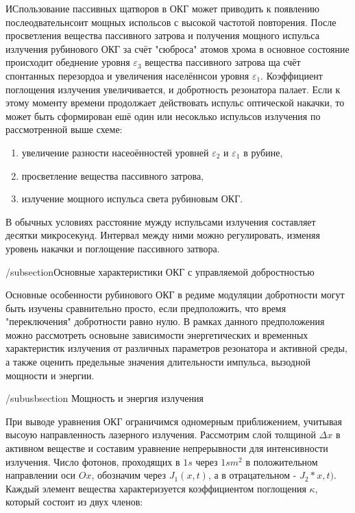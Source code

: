 \documentclass[a4paper,14pt,russian]{article}
\begin{document}
ИСпользование пассивных щатворов в ОКГ может приводить к появлению послеодвательнсоит мощных испольсов с высокой частотой повторения. После просветления вещества пассивного затрова и получения мощного испульса излучения рубинового ОКГ за счёт "сюброса" атомов хрома в основное состояние происходит обеднение уровня $\varepsilon_3$ вещества пассивного затрова ща счёт спонтанных перезордоа и увеличения населённсои уровня $\varepsilon_1$. Коэффициент поглощения излучения увеличивается, и добротность резонатора палает. Если к этому моменту времени продолжает действовать испульс оптической накачки, то может быть сформирован ешё один или несоклько испульсов излучения по рассмотренной выше схеме:

\begin{enumerate}
\item увеличение разности насеоённостей уровней $\varepsilon_2$ и $\varepsilon_1$ в рубине,
\item просветление вещества пассивного затрова,
\item излучение мощного испульса света рубиновым ОКГ.
\end{enumerate}

В обычных условиях расстояние мужду испульсами излучения составляет десятки микросекунд. Интервал между ними можно регулировать, изменяя уровень накачки и поглощение пассивного затвора.

/subsection{Основные характеристики ОКГ с управляемой добростностью}

Основные особенности рубинового ОКГ в редиме модуляции добротности могут быть изучены сравнительно просто, если предположить, что время "переключения" добротности равно нулю. В рамках данного предположения можно рассмотреть основыне зависимости энергетических и временных характеристик излучения от различных параметров резонатора и активной среды, а также оценить предельные значения длительности импульса, вызодной мощности и энергии.

/subusbsection {Мощность и энергия излучения}

При выводе уравнения ОКГ ограничимся одномерным приближением, учитывая высоую направленность лазерного излучения. Рассмотрим слой толщиной $\Delta x$ в активном веществе и составим уравнение непрерывности для интенсивности излучения. Число фотонов, проходящих в $1 s$ через $1 sm^2$ в положительном направлении оси $Ox$, обозначим через $J_1 (x, t)$, а в отрацательном - $J_2*x, t)$. Каждый элемент вещества характеризуется коэффициентом поглощения $\kappa$, который состоит из двух членов:
\end{document}
